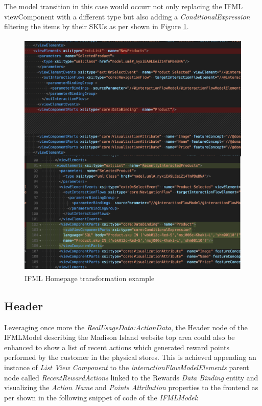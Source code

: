 The model transition in this case would occurr not only replacing the IFML viewComponent with a different type but also adding a \textit{ConditionalExpression} filtering the items by their SKUs as per shown in Figure \ref{fig:ifml-transformation-example}.

\vspace{0.5cm}
\begin{figure}[H]
  \centering
    \includegraphics[height=12cm]{images/madison/ifm-homepage-transformation.png}
  \caption{IFML Homepage transformation example}
  \label{fig:ifml-transformation-example}
\end{figure}
\vspace{0.5cm}

\subsection{Header}
\label{header-updates}
Leveraging once more the \textit{RealUsageData:ActionData}, the Header node of the IFMLModel describing the Madison Island website top area could also be enhanced to show a list of recent actions which generated reward points performed by the customer in the physical stores.  This is achieved appending  an instance of \textit{List View Component} to the \textit{interactionFlowModelElements} parent node called \textit{RecentRewardActions} linked to the Rewards \textit{Data Binding} entity and visualizing the \textit{Action Name} and \textit{Points Attribution} properties to the frontend as per shown in the following snippet of code of the \textit{IFMLModel}:

